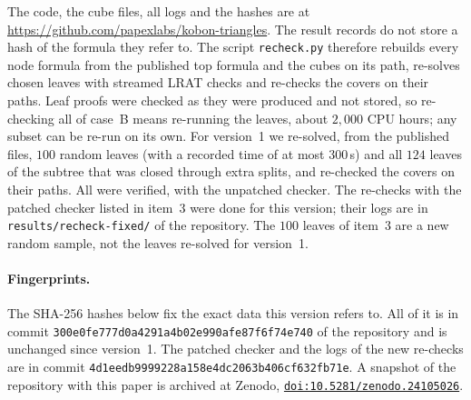 \documentclass[11pt]{article}
\newcommand{\doi}[1]{\href{https://doi.org/#1}{\nolinkurl{doi:#1}}}
\theoremstyle{definition}
\theoremstyle{remark}
\begin{document}
The code, the cube files, all logs and the hashes are at
\url{https://github.com/papexlabs/kobon-triangles}. The result records do not store a hash of the
formula they refer to. The script
\texttt{recheck.py} therefore rebuilds every node formula from the published top formula and the
cubes on its path, re-solves chosen leaves with streamed LRAT checks and re-checks the covers on
their paths. Leaf proofs were checked as they were produced and not stored, so re-checking all of
case~B means re-running the leaves, about $2{,}000$ CPU hours; any subset can be re-run on its own.
For version~1 we re-solved, from the published files, $100$ random leaves (with a recorded time
of at most $300$\,s) and all $124$ leaves of the subtree that was closed through extra splits,
and re-checked the covers on their paths. All were verified, with the unpatched checker. The
re-checks with the patched checker listed in item~3 were done for this version; their logs are in
\nolinkurl{results/recheck-fixed/} of the repository. The $100$ leaves of item~3 are a new random sample, not the leaves re-solved
for version~1.

\paragraph{Fingerprints.} The SHA-256 hashes below fix the exact data this version refers to. All
of it is in commit \texttt{300e0fe777d0a4291a4b02e990afe87f6f74e740} of the repository and is
unchanged since version~1. The patched checker and the logs of the new re-checks are in commit
\texttt{4d1eedb9999228a158e4dc2063b406cf632fb71e}. A snapshot of the repository with this paper is archived at Zenodo,
\doi{10.5281/zenodo.24105026}.

\smallskip
{}
\end{document}

